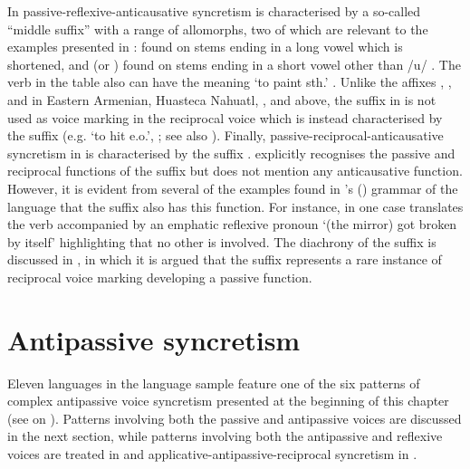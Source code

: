 In  passive-reflexive-anticausative syncretism is characterised by a so-called “middle suffix” with a range of allomorphs, two of which are relevant to the examples presented in :  found on stems ending in a long vowel which is shortened, and  (or ) found on stems ending in a short vowel other than /u/ \citep[276f.]{evans:1995}. The verb  in the table also can have the meaning ‘to paint sth.’ \citep[726]{evans:1995}. Unlike the affixes , ,  and  in Eastern Armenian, Huasteca Nahuatl, , and  above, the suffix  in  is not used as voice marking in the reciprocal voice which is instead characterised by the suffix  (e.g.  ‘to hit e.o.’, \citealt[487]{evans:1995}; see also ). Finally, passive-reciprocal-anticausative syncretism in  is characterised by the suffix . \citet[333ff., 342ff.]{kawachi:2007} explicitly recognises the passive and reciprocal functions of the suffix but does not mention any anticausative function. However, it is evident from several of the examples found in \citeauthor{kawachi:2007}’s (\citeyear[e.g. 117]{kawachi:2007}) grammar of the language that the suffix also has this function. For instance, in one case \citet[186]{kawachi:2007} translates the verb  accompanied by an emphatic reflexive pronoun ‘(the mirror) got broken by itself’ highlighting that no other  is involved. The diachrony of the  suffix  is discussed in , in which it is argued that the suffix represents a rare instance of reciprocal voice marking developing a passive function.

\largerpage
\section{Antipassive syncretism} \label{sec:complex-syncretism:antipassive}
Eleven languages in the language sample feature one of the six patterns of complex antipassive voice syncretism presented at the beginning of this chapter (see  on \pageref{tab:ch5:complex-patterns}). Patterns involving both the passive and antipassive voices are discussed in the next section, while patterns involving both the antipassive and reflexive voices are treated in  and applicative-antipassive-reciprocal syncretism in .

